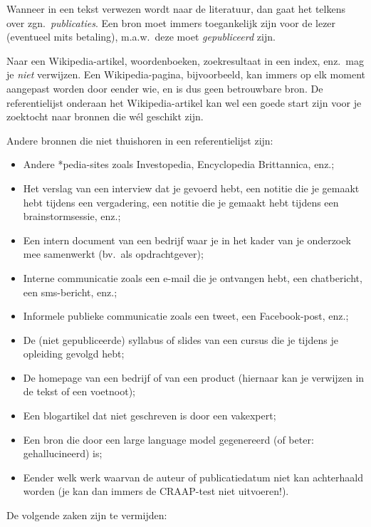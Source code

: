 Wanneer in een tekst verwezen wordt naar de literatuur, dan gaat het telkens over zgn.\ \emph{publicaties}. Een bron moet immers toegankelijk zijn voor de lezer (eventueel mits betaling), m.a.w.\ deze moet \textit{gepubliceerd} zijn.

Naar een Wikipedia-artikel, woordenboeken, zoekresultaat in een index, enz.\ mag je \emph{niet} verwijzen. Een Wikipedia-pagina, bijvoorbeeld, kan immers op elk moment aangepast worden door eender wie, en is dus geen betrouwbare bron. De referentielijst onderaan het Wikipedia-artikel kan wel een goede start zijn voor je zoektocht naar bronnen die wél geschikt zijn.

Andere bronnen die niet thuishoren in een referentielijst zijn:

\begin{itemize}
  \item Andere *pedia-sites zoals Investopedia, Encyclopedia Brittannica, enz.;
  \item Het verslag van een interview dat je gevoerd hebt, een notitie die je gemaakt hebt tijdens een vergadering, een notitie die je gemaakt hebt tijdens een brainstormsessie, enz.;
  \item Een intern document van een bedrijf waar je in het kader van je onderzoek mee samenwerkt (bv.\ als opdrachtgever);
  \item Interne communicatie zoals een e-mail die je ontvangen hebt, een chatbericht, een sms-bericht, enz.;
  \item Informele publieke communicatie zoals een tweet, een Facebook-post, enz.;
  \item De (niet gepubliceerde) syllabus of slides van een cursus die je tijdens je opleiding gevolgd hebt;
  \item De homepage van een bedrijf of van een product (hiernaar kan je verwijzen in de tekst of een voetnoot);
  \item Een blogartikel dat niet geschreven is door een vakexpert;
  \item Een bron die door een large language model gegenereerd (of beter: gehallucineerd) is;
  \item Eender welk werk waarvan de auteur of publicatiedatum niet kan achterhaald worden (je kan dan immers de CRAAP-test niet uitvoeren!).
\end{itemize}

De volgende zaken zijn te vermijden:

